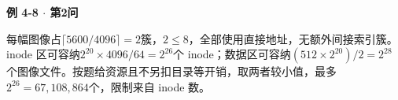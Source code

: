 {\color{ink}\bfseries 例 4-8 \(\cdot \) 第2问}\par\vspace{1bp}每幅图像占\(\lceil 5600/\allowbreak{}4096\rceil =\allowbreak{}2\)簇，\(2\le 8\)，全部使用直接地址，无额外间接索引簇。inode 区可容纳\(2^{20}\times 4096/\allowbreak{}64=\allowbreak{}2^{26}\)个 inode；数据区可容纳\((512\times 2^{20})/\allowbreak{}2=\allowbreak{}2^{28}\)个图像文件。按题给资源且不另扣目录等开销，取两者较小值，最多\(2^{26}=\allowbreak{}67,\allowbreak{}108,\allowbreak{}864\)个，限制来自 inode 数。

